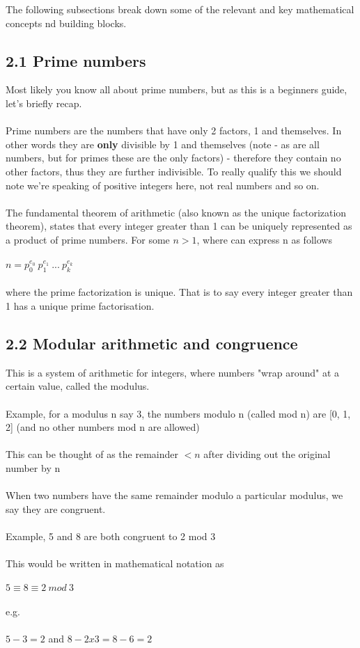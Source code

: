 \documentclass[11pt]{article}   	%
\begin{document}
The following subsections break down some of the relevant and key mathematical concepts nd building blocks.

\subsection*{2.1 Prime numbers}

Most likely you know all about prime numbers, but as this is a beginners guide, let's briefly recap. \\
\\
Prime numbers are the numbers that have only 2 factors, 1 and themselves. In other words they are \textbf{only} divisible by 1 and themselves (note - as are all numbers, but for primes these are the only factors) - therefore they contain no other factors, thus they are further indivisible. To really qualify this we should note we're speaking of positive integers here, not real numbers and so on. \\
\\
The fundamental theorem of arithmetic (also known as the unique factorization theorem), states that every integer greater than 1 can be uniquely represented as a product of prime numbers. For some $ n > 1 $, where can express n as follows \\
\\
$ n = p_0^{e_0} \ p_1^{e_1} \ ... \ p_k^{e_k} $ \\
\\
where the prime factorization is unique. That is to say every integer greater than 1 has a unique prime factorisation.


\subsection*{2.2 Modular arithmetic and congruence}

This is a system of arithmetic for integers, where numbers "wrap around" at a certain value, called the modulus. \\
\\
Example, for a modulus n say 3, the numbers modulo n (called mod n) are [0, 1, 2] (and no other numbers mod n are allowed) \\
\\
This can be thought of as the remainder $ < n $ after dividing out the original number by n \\
\\
When two numbers have the same remainder modulo a particular modulus, we say they are congruent. \\
\\
Example, 5 and 8 are both congruent to 2 mod 3 \\
\\
This would be written in mathematical notation as \\
\\
$ 5 \equiv 8 \equiv 2 \ mod \ 3 $ \\
\\
e.g. \\
\\
$ 5 - 3 = 2 $ and $ 8 - 2x3 = 8 - 6 = 2 $
\end{document}
